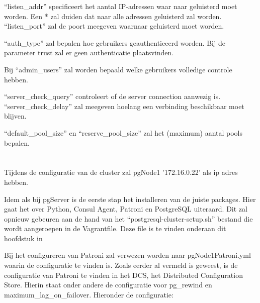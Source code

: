 
“listen\_addr” specificeert het aantal IP-adressen waar naar geluisterd moet worden. Een * zal duiden dat naar alle adressen geluisterd zal worden. “listen\_port” zal de poort meegeven waarnaar geluisterd moet worden.

“auth\_type” zal bepalen hoe gebruikers geauthenticeerd worden. Bij de parameter trust zal er geen authenticatie plaatsvinden.

Bij “admin\_users” zal worden bepaald welke gebruikers volledige controle hebben.

“server\_check\_query” controleert of de server connection aanwezig is. “server\_check\_delay” zal meegeven hoelang een verbinding beschikbaar moet blijven.

“default\_pool\_size” en “reserve\_pool\_size” zal het (maximum) aantal pools bepalen.


\section{}
\label{sec:pgNode1}
Tijdens de configuratie van de cluster zal pgNode1 '172.16.0.22' als ip adres hebben.

Idem als bij pgServer is de eerste stap het installeren van de juiste packages. Hier gaat het over Python, Consul Agent, Patroni en PostgreSQL uiteraard. Dit zal opnieuw gebeuren aan de hand van het “postgresql-cluster-setup.sh” bestand die wordt aangeroepen in de Vagrantfile. Deze file is te vinden onderaan dit hoofdstuk in 

Bij het configureren van Patroni zal verwezen worden naar pgNode1Patroni.yml waarin de configuratie te vinden is. Zoals eerder al vermeld is geweest, is de configuratie van Patroni te vinden in het DCS, het Distributed Configuration Store. Hierin staat onder andere de configuratie voor pg\_rewind en maximum\_lag\_on\_failover. Hieronder de configuratie:

